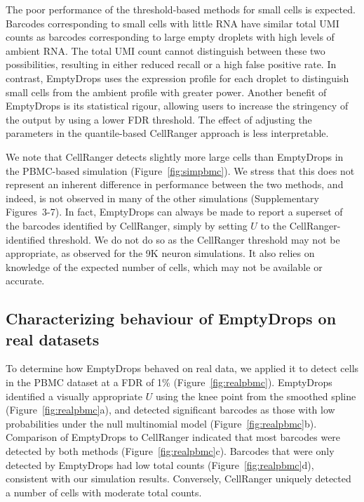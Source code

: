 \documentclass[10pt,letterpaper]{article}
\newcommand{\suppfigsimresults}{3-7}
\begin{document}
The poor performance of the threshold-based methods for small cells is expected.
Barcodes corresponding to small cells with little RNA have similar total UMI counts as barcodes corresponding to large empty droplets with high levels of ambient RNA.
The total UMI count cannot distinguish between these two possibilities, resulting in either reduced recall or a high false positive rate.
In contrast, EmptyDrops uses the expression profile for each droplet to distinguish small cells from the ambient profile with greater power.
Another benefit of EmptyDrops is its statistical rigour, allowing users to increase the stringency of the output by using a lower FDR threshold.
The effect of adjusting the parameters in the quantile-based CellRanger approach is less interpretable.

We note that CellRanger detects slightly more large cells than EmptyDrops in the PBMC-based simulation (Figure~\ref{fig:simpbmc}).
We stress that this does not represent an inherent difference in performance between the two methods, and indeed, is not observed in many of the other simulations (Supplementary Figures~\suppfigsimresults{}).
In fact, EmptyDrops can always be made to report a superset of the barcodes identified by CellRanger, simply by setting $U$ to the CellRanger-identified threshold.
We do not do so as the CellRanger threshold may not be appropriate, as observed for the 9K neuron simulations.
It also relies on knowledge of the expected number of cells, which may not be available or accurate.

\subsection*{Characterizing behaviour of EmptyDrops on real datasets}
To determine how EmptyDrops behaved on real data, we applied it to detect cells in the PBMC dataset at a FDR of 1\% (Figure~\ref{fig:realpbmc}).
EmptyDrops identified a visually appropriate $U$ using the knee point from the smoothed spline (Figure~\ref{fig:realpbmc}a),
and detected significant barcodes as those with low probabilities under the null multinomial model (Figure~\ref{fig:realpbmc}b).
Comparison of EmptyDrops to CellRanger indicated that most barcodes were detected by both methods (Figure~\ref{fig:realpbmc}c).
Barcodes that were only detected by EmptyDrops had low total counts (Figure~\ref{fig:realpbmc}d), consistent with our simulation results.
Conversely, CellRanger uniquely detected a number of cells with moderate total counts.
\end{document}
